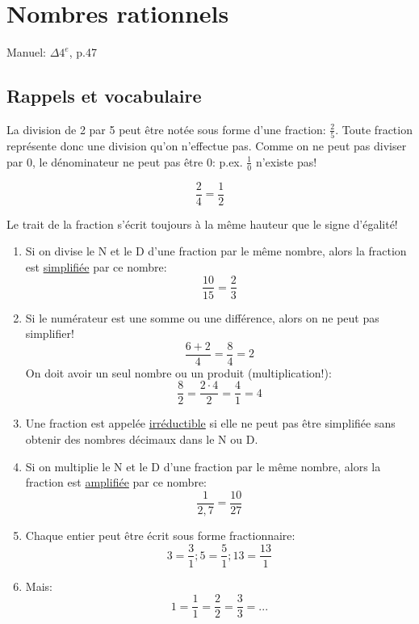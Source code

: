 \chapter{Nombres rationnels}



Manuel: $\Delta 4^e$, p.47

\section{Rappels et vocabulaire}

La division de 2 par 5 peut être notée sous forme d'une fraction: $\frac{2}{5}$.
Toute fraction représente donc une division qu'on n'effectue pas.
Comme on ne peut pas diviser par 0, le dénominateur ne peut pas être 0:
p.ex. $\frac{1}{0}$ n'existe pas!

$$ \frac{2}{4} = \frac{1}{2} $$

\attention Le trait de la fraction s'écrit toujours à la même hauteur que le signe d'égalité!

\begin{enumerate}[label=$\triangleright$]
 \item Si on divise le N et le D d'une fraction par le même nombre, alors la fraction est \uline{simplifiée} par ce nombre:
 $$ \dfrac{10}{15}=\dfrac{2}{3} $$
  \item \attention Si le numérateur est une somme ou une différence, alors on ne peut pas simplifier!
    $$ \frac{6+2}{4} = \frac{8}{4}=2 $$
    On doit avoir un seul nombre ou un produit (multiplication!):
    $$ \dfrac{8}{2}= \dfrac{2\cdot 4}{2}=\dfrac{4}{1}=4 $$
 
 \item Une fraction est appelée \uline{irréductible} si elle ne peut pas être simplifiée sans obtenir des nombres décimaux dans le N ou D.
 
 \item Si on multiplie le N et le D d'une fraction par le même nombre, alors la fraction est \uline{amplifiée} par ce nombre:
 $$ \dfrac{1}{2,7}=\dfrac{10}{27} $$
 
 \item Chaque entier peut être écrit sous forme fractionnaire:
 $$ 3=\frac{3}{1}; 5 = \dfrac{5}{1}; 13 = \dfrac{13}{1} $$
 
 \item Mais:
 $$ 1=\frac{1}{1} = \dfrac{2}{2} = \dfrac{3}{3} = ... $$

\end{enumerate}


